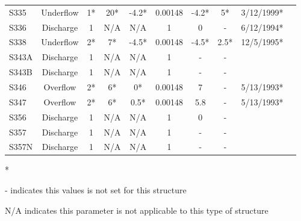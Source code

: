 \begin{table}[h]
\begin{tabular}{@{}lccccccccc@{}}
{S335}          & Underflow     & 1*       & 20*         & -4.2*        & 0.00148     & -4.2*           & 5*      & 3/12/1999*  \\
{S336}          & Discharge     & 1        & N/A         & N/A          & 1           &  0              & -       & 6/12/1994*  \\
{S338}          & Underflow     & 2*       & 7*          & -4.5*        & 0.00148     &  -4.5*          & 2.5*    & 12/5/1995*  \\
{S343A}         & Discharge     & 1        & N/A         & N/A          & 1           &  -              & -       &             \\
{S343B}         & Discharge     & 1        & N/A         & N/A          & 1           &  -              & -       &             \\
{S346}          & Overflow      & 2*       & 6*          & 0*           & 0.00148     &  7              & -       & 5/13/1993*  \\
{S347}          & Overflow      & 2*       & 6*          & 0.5*         & 0.00148     &  5.8            & -       & 5/13/1993*  \\
{S356}          & Discharge     & 1        & N/A         & N/A          & 1           &  0              & -       &             \\
{S357}          & Discharge     & 1        & N/A         & N/A          & 1           &  -              & -       &             \\
{S357N}         & Discharge     & 1        & N/A         & N/A          & 1           &  -              & -       &             \\
\hline
\end{tabular}

* \cite{corp2005}

- indicates this values is not set for this structure

N/A indicates this parameter is not applicable to this type of structure
\end{table}
\normalsize


\cleardoublepage
